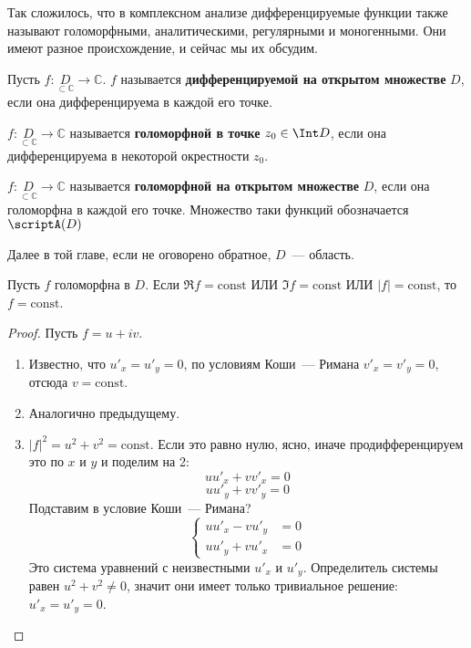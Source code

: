\documentclass{article}
\begin{document}
    \begin{remark}
        Так сложилось, что в комплексном анализе дифференцируемые функции также называют голоморфными, аналитическими, регулярными и моногенными. Они имеют разное происхождение, и сейчас мы их обсудим.
    \end{remark}
    \begin{definition}
        Пусть $f\colon\underset{\subset\mathbb C}D\to\mathbb C$. $f$ называется \textbf{дифференцируемой на открытом множестве} $D$, если она дифференцируема в каждой его точке.
    \end{definition}
    \begin{definition}
        $f\colon\underset{\subset\mathbb C}D\to\mathbb C$ называется \textbf{голоморфной в точке} $z_0\in\Int D$, если она дифференцируема в некоторой окрестности $z_0$.
    \end{definition}
    \begin{definition}
        $f\colon\underset{\subset\mathbb C}D\to\mathbb C$ называется \textbf{голоморфной на открытом множестве} $D$, если она голоморфна в каждой его точке. Множество таки функций обозначается $\scriptA(D)$
    \end{definition}
    \begin{remark}
        Далее в той главе, если не оговорено обратное, $D$~--- область.
    \end{remark}
    \begin{theorem}
        Пусть $f$ голоморфна в $D$. Если $\Re f=\mathrm{const}$ ИЛИ $\Im f=\mathrm{const}$ ИЛИ $|f|=\mathrm{const}$, то $f=\mathrm{const}$.
    \end{theorem}
    \begin{proof}
        Пусть $f=u+iv$.
        \begin{enumerate}
            \item Известно, что $u'_x=u'_y=0$, по условиям Коши~--- Римана $v'_x=v'_y=0$, отсюда $v=\mathrm{const}$.
            \item Аналогично предыдущему.
            \item $|f|^2=u^2+v^2=\mathrm{const}$. Если это равно нулю, ясно, иначе продифференцируем это по $x$ и $y$ и поделим на 2:
            $$
            uu'_x+vv'_x=0
            $$
            $$
            uu'_y+vv'_y=0
            $$
            Подставим в условие Коши~--- Римана?
            $$
            \left\{\begin{aligned}
                uu'_x-vu'_y&=0\\
                uu'_y+vu'_x&=0
            \end{aligned}\right.
            $$
            Это система уравнений с неизвестными $u'_x$ и $u'_y$. Определитель системы равен $u^2+v^2\neq0$, значит они имеет только тривиальное решение: $u'_x=u'_y=0$.
        \end{enumerate}
    \end{proof}
\end{document}
